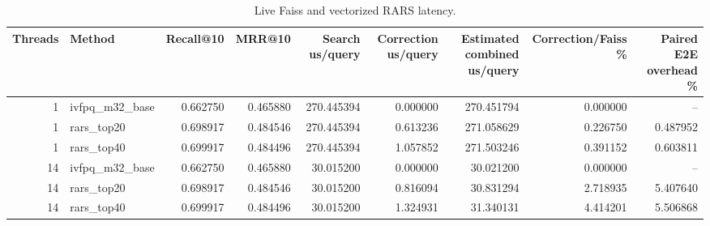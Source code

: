 \begin{table}[t]
\caption{Live Faiss and vectorized RARS latency.}
\label{tab:rars-system}
\begin{tabular}{rlrrrrrrr}
\toprule
Threads & Method & Recall@10 & MRR@10 & Search us/query & Correction us/query & Estimated combined us/query & Correction/Faiss \% & Paired E2E overhead \% \\
\midrule
1 & ivfpq\_m32\_base & 0.662750 & 0.465880 & 270.445394 & 0.000000 & 270.451794 & 0.000000 & -- \\
1 & rars\_top20 & 0.698917 & 0.484546 & 270.445394 & 0.613236 & 271.058629 & 0.226750 & 0.487952 \\
1 & rars\_top40 & 0.699917 & 0.484496 & 270.445394 & 1.057852 & 271.503246 & 0.391152 & 0.603811 \\
14 & ivfpq\_m32\_base & 0.662750 & 0.465880 & 30.015200 & 0.000000 & 30.021200 & 0.000000 & -- \\
14 & rars\_top20 & 0.698917 & 0.484546 & 30.015200 & 0.816094 & 30.831294 & 2.718935 & 5.407640 \\
14 & rars\_top40 & 0.699917 & 0.484496 & 30.015200 & 1.324931 & 31.340131 & 4.414201 & 5.506868 \\
\bottomrule
\end{tabular}
\end{table}
